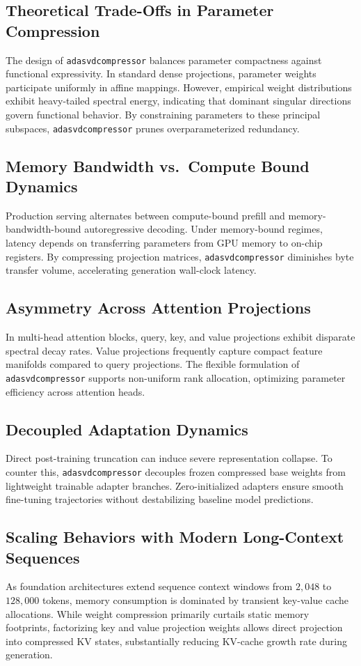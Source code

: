 \documentclass{article}
\begin{document}
\subsection{Theoretical Trade-Offs in Parameter Compression}
The design of \texttt{adasvdcompressor} balances parameter compactness against functional expressivity. In standard dense projections, parameter weights participate uniformly in affine mappings. However, empirical weight distributions exhibit heavy-tailed spectral energy, indicating that dominant singular directions govern functional behavior. By constraining parameters to these principal subspaces, \texttt{adasvdcompressor} prunes overparameterized redundancy.

\subsection{Memory Bandwidth vs.\ Compute Bound Dynamics}
Production serving alternates between compute-bound prefill and memory-bandwidth-bound autoregressive decoding. Under memory-bound regimes, latency depends on transferring parameters from GPU memory to on-chip registers. By compressing projection matrices, \texttt{adasvdcompressor} diminishes byte transfer volume, accelerating generation wall-clock latency.

\subsection{Asymmetry Across Attention Projections}
In multi-head attention blocks, query, key, and value projections exhibit disparate spectral decay rates. Value projections frequently capture compact feature manifolds compared to query projections. The flexible formulation of \texttt{adasvdcompressor} supports non-uniform rank allocation, optimizing parameter efficiency across attention heads.

\subsection{Decoupled Adaptation Dynamics}
Direct post-training truncation can induce severe representation collapse. To counter this, \texttt{adasvdcompressor} decouples frozen compressed base weights from lightweight trainable adapter branches. Zero-initialized adapters ensure smooth fine-tuning trajectories without destabilizing baseline model predictions.

\subsection{Scaling Behaviors with Modern Long-Context Sequences}
As foundation architectures extend sequence context windows from $2{,}048$ to $128{,}000$ tokens, memory consumption is dominated by transient key-value cache allocations. While weight compression primarily curtails static memory footprints, factorizing key and value projection weights allows direct projection into compressed KV states, substantially reducing KV-cache growth rate during generation.
\end{document}
